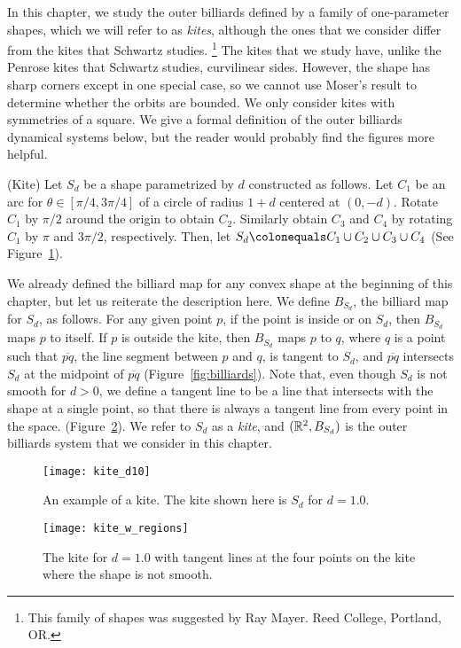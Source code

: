 \documentclass[10pt,twoside]{book}
\begin{document}
In this chapter, we study the outer billiards defined by a family of one-parameter shapes, which we will refer to as \textit{kites}, although the ones that we consider differ from the kites that Schwartz studies.
\footnote{This family of shapes was suggested by Ray Mayer. Reed College, Portland, OR.}
The kites that we study have, unlike the Penrose kites that Schwartz studies, curvilinear sides.
However, the shape has sharp corners except in one special case, so we cannot use Moser's result to determine whether the orbits are bounded.
We only consider kites with symmetries of a square.
We give a formal definition of the outer billiards dynamical systems below, but the reader would probably find the figures more helpful.
\begin{definition}
  (Kite)
  Let $S_d$ be a shape parametrized by $d$ constructed as follows.
  Let $C_1$ be an arc for $\theta \in [\pi/4, 3\pi/4]$ of a circle of radius $1+d$ centered at $(0,-d)$.
  Rotate $C_1$ by $\pi/2$ around the origin to obtain $C_2$.
  Similarly obtain $C_3$ and $C_4$ by rotating $C_1$ by $\pi$ and $3\pi/2$, respectively.
  Then, let $S_d \ceq C_1 \cup C_2 \cup C_3 \cup C_4$ (See Figure~\ref{fig:kiteeg}).

  We already defined the billiard map for any convex shape at the beginning of this chapter, but let us reiterate the description here.
  We define $B_{S_d}$, the billiard map for $S_d$, as follows.
  For any given point $p$, if the point is inside or on $S_d$, then $B_{S_d}$ maps $p$ to itself.
  If $p$ is outside the kite, then $B_{S_d}$ maps $p$ to $q$, where $q$ is a point such that $\overline{pq}$, the line segment between $p$ and $q$, is tangent to $S_d$, and $\overline{pq}$ intersects $S_d$ at the midpoint of $\overline{pq}$ (Figure~\ref{fig:billiards}).
  Note that, even though $S_d$ is not smooth for $d > 0$, we define a tangent line to be a line that intersects with the shape at a single point, so that there is always a tangent line from every point in the space. 
  (Figure~\ref{fig:kite-regions}).
  We refer to $S_d$ as a \textit{kite}, and $(\mathbb{R}^2, B_{S_d})$ is the outer billiards system that we consider in this chapter.

\end{definition}
\begin{figure}[ht]
  \begin{center}
    \texttt{[image: kite\_d10]}
    \caption{An example of a kite. The kite shown here is $S_d$ for $d = 1.0$.}
    \label{fig:kiteeg}
  \end{center}
\end{figure}
\begin{figure}[ht]
  \begin{center}
    \texttt{[image: kite\_w\_regions]}
    \caption{The kite for $d = 1.0$ with tangent lines at the four points on the kite where the shape is not smooth.}
    \label{fig:kite-regions}
  \end{center}
\end{figure}
\end{document}
